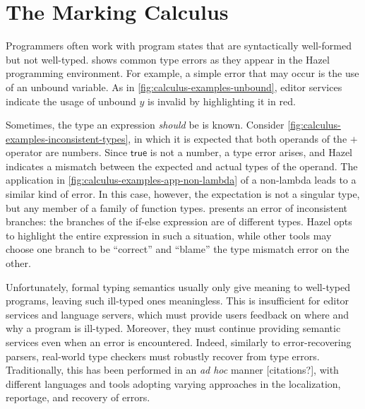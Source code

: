 
\section{The Marking Calculus}
\label{sec:calculus}

Programmers often work with program states that are syntactically well-formed but not well-typed.
 shows common type errors as they appear in the Hazel programming
environment. For example, a simple error that may occur is the use of an unbound variable. As in
\cref{fig:calculus-examples-unbound}, editor services indicate the usage of unbound $y$ is invalid
by highlighting it in red.



Sometimes, the type an expression \emph{should} be is known. Consider
\cref{fig:calculus-examples-inconsistent-types}, in which it is expected that both operands of the
$+$ operator are numbers. Since $\textsf{true}$ is not a number, a type error arises, and Hazel
indicates a mismatch between the expected and actual types of the operand. The application in
\cref{fig:calculus-examples-app-non-lambda} of a non-lambda leads to a similar kind of error. In
this case, however, the expectation is not a singular type, but any member of a family of function
types.  presents an error of inconsistent
branches: the branches of the if-else expression are of different types. Hazel opts to highlight the
entire expression in such a situation, while other tools may choose one branch to be ``correct'' and
``blame'' the type mismatch error on the other.


Unfortunately, formal typing semantics usually only give meaning to well-typed programs, leaving
such ill-typed ones meaningless. This is insufficient for editor services and language servers,
which must provide users feedback on where and why a program is ill-typed. Moreover, they must
continue providing semantic services even when an error is encountered. Indeed, similarly to
error-recovering parsers, real-world type checkers must robustly recover from type errors.
Traditionally, this has been performed in an \emph{ad hoc} manner [citations?], with different
languages and tools adopting varying approaches in the localization, reportage, and recovery of
errors.


